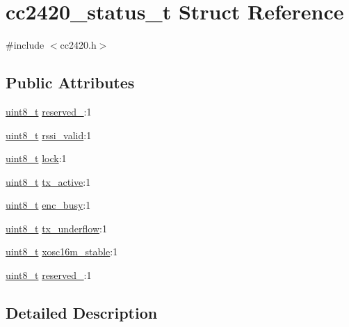 \hypertarget{structcc2420__status__t}{}\section{cc2420\+\_\+status\+\_\+t Struct Reference}
\label{structcc2420__status__t}


{\ttfamily \#include $<$cc2420.\+h$>$}

\subsection*{Public Attributes}
\begin{DoxyCompactItemize}
\item 
\hyperlink{_p_e___types_8h_aba7bc1797add20fe3efdf37ced1182c5}{uint8\+\_\+t} \hyperlink{structcc2420__status__t_a3887f68a2676cd4457baef22ec4552e8}{reserved\+\_}\+:1
\item 
\hyperlink{_p_e___types_8h_aba7bc1797add20fe3efdf37ced1182c5}{uint8\+\_\+t} \hyperlink{structcc2420__status__t_a1228de41d88b76e8c81664ebf368f9b9}{rssi\+\_\+valid}\+:1
\item 
\hyperlink{_p_e___types_8h_aba7bc1797add20fe3efdf37ced1182c5}{uint8\+\_\+t} \hyperlink{structcc2420__status__t_aaa02843a2bf240864389da62c44988d9}{lock}\+:1
\item 
\hyperlink{_p_e___types_8h_aba7bc1797add20fe3efdf37ced1182c5}{uint8\+\_\+t} \hyperlink{structcc2420__status__t_a24df8bef402880c720f40925cc43ab94}{tx\+\_\+active}\+:1
\item 
\hyperlink{_p_e___types_8h_aba7bc1797add20fe3efdf37ced1182c5}{uint8\+\_\+t} \hyperlink{structcc2420__status__t_aadd27306e9ca766cd40fb24fbaad1daa}{enc\+\_\+busy}\+:1
\item 
\hyperlink{_p_e___types_8h_aba7bc1797add20fe3efdf37ced1182c5}{uint8\+\_\+t} \hyperlink{structcc2420__status__t_a610f486d602b775ad069fa113356c201}{tx\+\_\+underflow}\+:1
\item 
\hyperlink{_p_e___types_8h_aba7bc1797add20fe3efdf37ced1182c5}{uint8\+\_\+t} \hyperlink{structcc2420__status__t_acbd70cdcf05944ea2b21b11b235d5d7a}{xosc16m\+\_\+stable}\+:1
\item 
\hyperlink{_p_e___types_8h_aba7bc1797add20fe3efdf37ced1182c5}{uint8\+\_\+t} \hyperlink{structcc2420__status__t_aa3024b0261e9233ddf9b5a03803605e3}{reserved\+\_}\+:1
\end{DoxyCompactItemize}


\subsection{Detailed Description}



